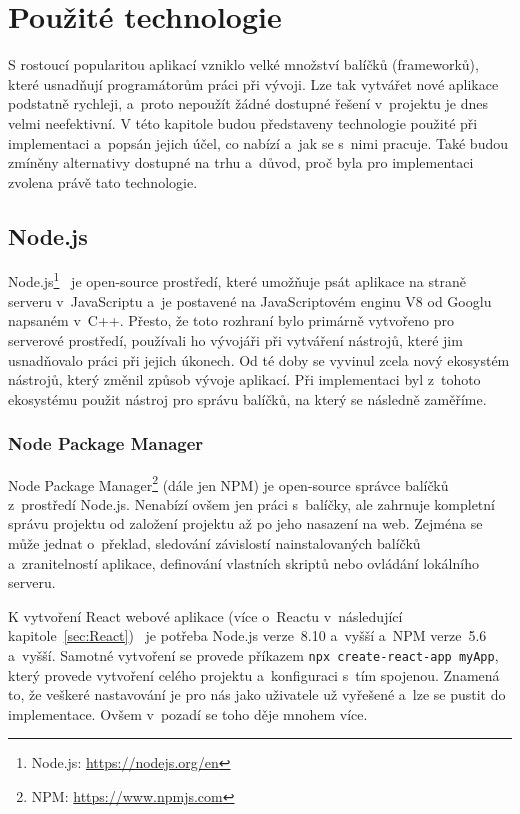\chapter{Použité technologie}
\label{chap:Použité technologie}

S rostoucí popularitou aplikací vzniklo velké množství balíčků (frameworků), které usnadňují programátorům práci při vývoji. Lze tak vytvářet nové aplikace podstatně rychleji, a~proto nepoužít žádné dostupné řešení v~projektu je dnes velmi neefektivní. V této kapitole budou představeny technologie použité při implementaci a~popsán jejich účel, co nabízí a~jak se s~nimi pracuje. Také budou zmíněny alternativy dostupné na trhu a~důvod, proč byla pro implementaci zvolena právě tato technologie.

\section{Node.js}
Node.js\footnote{Node.js: \url{https://nodejs.org/en}}~\cite{website:GuideToNpm} je open-source prostředí, které umožňuje psát aplikace na straně serveru v~JavaScriptu a~je postavené na JavaScriptovém enginu V8 od Googlu napsaném v~C++. Přesto, že toto rozhraní bylo primárně vytvořeno pro serverové prostředí, používali ho vývojáři při vytváření nástrojů, které jim usnadňovalo práci při jejich úkonech. Od té doby se vyvinul zcela nový ekosystém nástrojů, který změnil způsob vývoje aplikací. Při implementaci byl z~tohoto ekosystému použit nástroj pro správu balíčků, na který se následně zaměříme.

\subsection*{Node Package Manager}
\label{sec:NPM}
Node Package Manager\footnote{NPM: \url{https://www.npmjs.com}} (dále jen NPM) je open-source správce balíčků z~prostředí Node.js. Nenabízí ovšem jen práci s~balíčky, ale zahrnuje kompletní správu projektu od založení projektu až po jeho nasazení na web. Zejména se může jednat o~překlad, sledování závislostí nainstalovaných balíčků a~zranitelností aplikace, definování vlastních skriptů nebo ovládání lokálního serveru.

K vytvoření React webové aplikace (více o~Reactu v~následující kapitole~\ref{sec:React})~\cite{website:createReactApp} je potřeba Node.js verze~8.10 a~vyšší a~NPM verze~5.6 a~vyšší. Samotné vytvoření se provede příkazem \texttt{npx~create-react-app~myApp}, který provede vytvoření celého projektu a~konfiguraci s~tím spojenou. Znamená to, že veškeré nastavování je pro nás jako uživatele už vyřešené a~lze se pustit do implementace. Ovšem v~pozadí se toho děje mnohem více.

